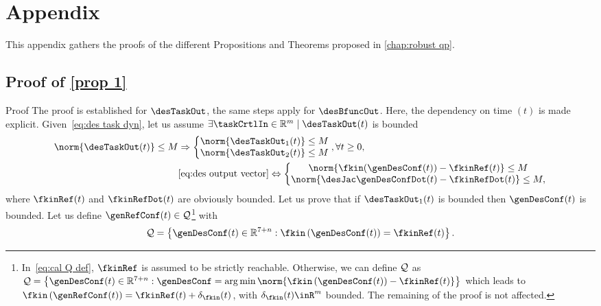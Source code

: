 \chapter{Appendix}\label{appendix}
This appendix gathers the proofs of the different Propositions and Theorems proposed in \cref{chap:robust qp}.
\section{Proof of \cref{prop 1}}\label{proof:prop1}
\begin{custumProof}{Proof} 
	The proof is established for $\desTaskOut $, the same steps apply for $\desBfuncOut $. Here, the dependency on time $(t)$ is made explicit. Given~\cref{eq:des task dyn}, let us assume  $\exists\taskCrtlIn\in\mathbb{R}^{m} \;|\; \desTaskOut (t)$ is bounded
	\begin{align}\label{eq:boundedness of xi}
		\begin{split}
			\norm{\desTaskOut(t)} \leq M &\Rightarrow \left\{\begin{matrix}
				\norm{\desTaskOut_1(t)}  \leq M\\ 
				\norm{\desTaskOut_2(t)}  \leq M 
			\end{matrix}\right., \forall t\geq0, \\
			&\cref{eq:des output vector}\Leftrightarrow \left\{\begin{matrix}
				\norm{\fkin(\genDesConf(t)) - \fkinRef(t)}  \leq M\\ 
				\norm{\desJac\genDesConfDot(t) - \fkinRefDot(t) }  \leq M ,
			\end{matrix}\right.
		\end{split} 
	\end{align} 
	where $\fkinRef(t)$ and $\fkinRefDot(t)$ are obviously bounded. 
	Let us prove that if $\desTaskOut_1(t) $ is bounded then $\genDesConf(t) $ is bounded. 
	Let us define $\genRefConf(t)\in{\cal Q}$\footnote{In~\cref{eq:cal Q def}, $\fkinRef$ is assumed to be strictly reachable. Otherwise, we can define $\cal Q$ as ${\cal Q} =\left\{\genDesConf(t) \in\mathbb{R}^{7+n}:\genDesConf = \arg\min\norm{\fkin\left(\genDesConf(t) \right)-\fkinRef(t)}\right\}$ which leads to $\fkin\left(\genRefConf(t)\right) = \fkinRef(t) + \delta_{\fkin}(t)$, with $\delta_{\fkin}(t)\inR^{m}$ bounded. The remaining of the proof is not affected.} with
	\begin{equation}\label{eq:cal Q def}
		{\cal Q} =\left\{\genDesConf(t) \in\mathbb{R}^{7+n}:\fkin\left(\genDesConf(t) \right)=\fkinRef(t)\right\}.

\end{equation}
\end{custumProof}
